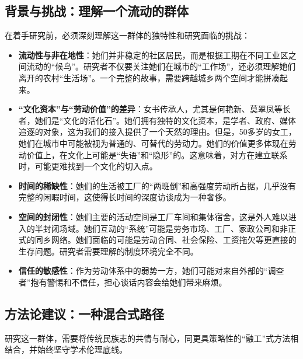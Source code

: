 \documentclass[UTF8]{ctexart}
\begin{document}
\subsection{背景与挑战：理解一个流动的群体}
在着手研究前，必须深刻理解这一群体的独特性和研究面临的挑战：
\begin{itemize}
    \item \textbf{流动性与非在地性}：她们并非稳定的社区居民，而是根据工期在不同工业区之间流动的“候鸟”。研究者不仅要关注她们在城市的“工作场”，还必须理解她们离开的农村“生活场”。一个完整的故事，需要跨越城乡两个空间才能拼凑起来。
    \item \textbf{“文化资本”与“劳动价值”的差异}：女书传承人，尤其是何艳新、莫翠凤等长者，她们是“文化的活化石”。她们拥有独特的文化资本，是学者、政府、媒体追逐的对象，这为我们的接入提供了一个天然的理由。但是，50多岁的女工，她们在城市中可能被视为普通的、可替代的劳动力。她们的价值更多体现在劳动价值上，在文化上可能是“失语”和“隐形”的。这意味着，对方在建立联系时，可能更难找到一个文化的切入点。
    \item \textbf{时间的稀缺性}：她们的生活被工厂的“两班倒”和高强度劳动所占据，几乎没有完整的闲暇时间，这使得长时间的深度访谈成为一种奢侈。
    \item \textbf{空间的封闭性}：她们主要的活动空间是工厂车间和集体宿舍，这是外人难以进入的半封闭场域。她们互动的“系统”可能是劳务市场、工厂、家政公司和非正式的同乡网络。她们面临的可能是劳动合同、社会保险、工资拖欠等更直接的生存问题。研究者需要理解的制度环境完全不同。
    \item \textbf{信任的敏感性}：作为劳动体系中的弱势一方，她们可能对来自外部的“调查者”抱有警惕和不信任，担心谈话内容会给她们带来麻烦。
\end{itemize}

\subsection{方法论建议：一种混合式路径}
研究这一群体，需要将传统民族志的共情与耐心，同更具策略性的“融工”式方法相结合，并始终坚守学术伦理底线。
\end{document}
